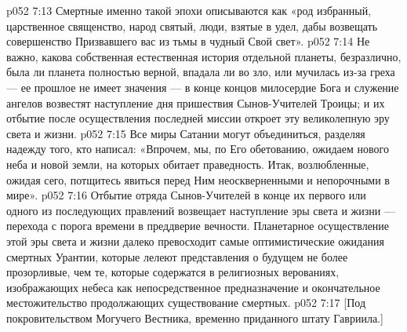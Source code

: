 \vs p052 7:13 Смертные именно такой эпохи описываются как «род избранный, царственное священство, народ святый, люди, взятые в удел, дабы возвещать совершенство Призвавшего вас из тьмы в чудный Свой свет».
\vs p052 7:14 \pc Не важно, какова собственная естественная история отдельной планеты, безразлично, была ли планета полностью верной, впадала ли во зло, или мучилась из\hyp{}за греха --- ее прошлое не имеет значения --- в конце концов милосердие Бога и служение ангелов возвестят наступление дня пришествия Сынов\hyp{}Учителей Троицы; и их отбытие после осуществления последней миссии откроет эту великолепную эру света и жизни.
\vs p052 7:15 Все миры Сатании могут объединиться, разделяя надежду того, кто написал: «Впрочем, мы, по Его обетованию, ожидаем нового неба и новой земли, на которых обитает праведность. Итак, возлюбленные, ожидая сего, потщитесь явиться перед Ним неоскверненными и непорочными в мире».
\vs p052 7:16 \pc Отбытие отряда Сынов\hyp{}Учителей в конце их первого или одного из последующих правлений возвещает наступление эры света и жизни --- перехода с порога времени в преддверие вечности. Планетарное осуществление этой эры света и жизни далеко превосходит самые оптимистические ожидания смертных Урантии, которые лелеют представления о будущем не более прозорливые, чем те, которые содержатся в религиозных верованиях, изображающих небеса как непосредственное предназначение и окончательное местожительство продолжающих существование смертных.
\vsetoff
\vs p052 7:17 [Под покровительством Могучего Вестника, временно приданного штату Гавриила.]

